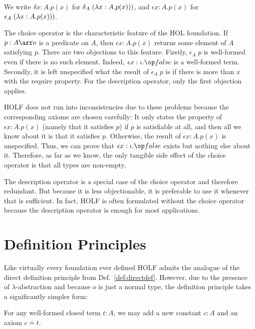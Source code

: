 \begin{notation}
We write $\delta x:A.p(x)$ for $\delta_A\;(\lambda x:A.p(x)))$, and $\epsilon x:A.p(x)$ for $\epsilon_A\;(\lambda x:A.p(x)))$.
\end{notation}

The choice operator is the characteristic feature of the HOL foundation. If $p:A\arr o$ is a predicate on $A$, then $\epsilon x:A.p(x)$ returns some element of $A$ satisfying $p$. There are two objections to this feature. Firstly, $\epsilon_A\;p$ is well-formed even if there is no such element. Indeed, $\epsilon x:\iota.\false$ is a well-formed term. Secondly, it is left unspecified what the result of $\epsilon_A\;p$ is if there is more than $x$ with the require property. For the description operator, only the first objection applies.

HOLF does not run into inconsistencies due to these problems because the corresponding axioms are chosen carefully: It only states the property of $\epsilon x:A.p(x)$ (namely that it satisfies $p$) if $p$ is satisfiable at all, and then all we know about it is that it satisfies $p$. Otherwise, the result of $\epsilon x:A.p(x)$ is unspecified.
Thus, we can prove that $\epsilon x:\iota.\false$ exists but nothing else about it. Therefore, as far as we know, the only tangible side effect of the choice operator is that all types are non-empty.

The description operator is a special case of the choice operator and therefore redundant. But because it is less objectionable, it is preferable to use it whenever that is sufficient. In fact, HOLF is often formulated without the choice operator because the description operator is enough for most applications.

\section{Definition Principles}

Like virtually every foundation ever defined HOLF admits the analogue of the direct definition principle from Def.~\ref{def:directdef}. However, due to the presence of $\lambda$-abstraction and because $o$ is just a normal type, the definition principle takes a significantly simpler form:

\begin{definition}
For any well-formed closed term $t:A$, we may add a new constant $c:A$ and an axiom $c\doteq t$.
\end{definition}

